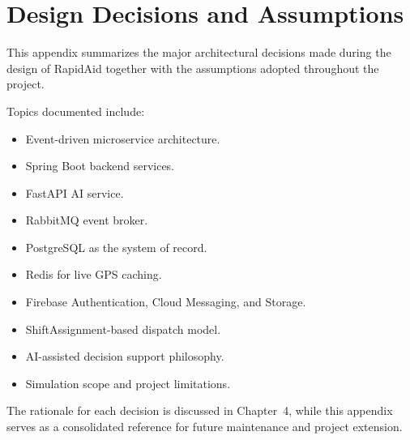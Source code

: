 \chapter{Design Decisions and Assumptions}
\label{appendix:decisions}

This appendix summarizes the major architectural decisions made during the design of RapidAid together with the assumptions adopted throughout the project.

Topics documented include:

\begin{itemize}
    \item Event-driven microservice architecture.
    \item Spring Boot backend services.
    \item FastAPI AI service.
    \item RabbitMQ event broker.
    \item PostgreSQL as the system of record.
    \item Redis for live GPS caching.
    \item Firebase Authentication, Cloud Messaging, and Storage.
    \item ShiftAssignment-based dispatch model.
    \item AI-assisted decision support philosophy.
    \item Simulation scope and project limitations.
\end{itemize}

The rationale for each decision is discussed in Chapter~4, while this appendix serves as a consolidated reference for future maintenance and project extension.
